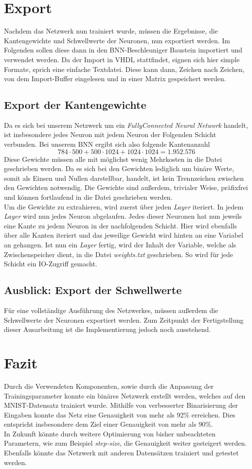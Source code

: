 \chapter{Export}
Nachdem das Netzwerk nun trainiert wurde, müssen die Ergebnisse, die Kantengewichte und Schwellwerte der Neuronen, nun exportiert werden. Im Folgenden sollen diese dann in den BNN-Beschleuniger Baustein importiert und verwendet werden. Da der Import in VHDL stattfindet, eignen sich hier simple Formate, sprich eine einfache Textdatei. Diese kann dann, Zeichen nach Zeichen, von dem Import-Buffer eingelesen und in einer Matrix gespeichert werden.
\section{Export der Kantengewichte}\label{exportKanten}
Da es sich bei unserem Netzwerk um ein \textit{FullyConnected Neural Network} handelt, ist insbesondere jedes Neuron mit jedem Neuron der Folgenden Schicht verbunden. Bei unserem BNN ergibt sich also folgende Kantenanzahl
\[784 \cdot 500 + 500 \cdot 1024 + 1024 \cdot 1024 = 1.952.576 \]
Diese Gewichte müssen alle mit möglichst wenig Mehrkosten in die Datei geschrieben werden. Da es sich bei den Gewichten lediglich um binäre Werte, somit als Einsen und Nullen darstellbar, handelt, ist kein Trennzeichen zwischen den Gewichten notwendig. Die Gewichte sind außerdem, trivialer Weise, präfixfrei und können fortlaufend in die Datei geschrieben werden.\\
Um die Gewichte zu extrahieren, wird zuerst über jeden \textit{Layer} iteriert. In jedem \textit{Layer} wird nun jedes Neuron abgelaufen. Jedes dieser Neuronen hat nun jeweils eine Kante zu jedem Neuron in der nachfolgenden Schicht. Hier wird ebenfalls über alle Kanten iteriert und das jeweilige Gewicht wird hinten an eine Variabel an gehangen. Ist nun ein \textit{Layer} fertig, wird der Inhalt der Variable, welche als Zwischenspeicher dient, in die Datei \textit{weights.txt} geschrieben. So wird für jede Schicht ein IO-Zugriff gemacht.
\section{Ausblick: Export der Schwellwerte}
Für eine vollständige Ausführung des Netzwerkes, müssen außerdem die Schwellwerte der Neuronen exportiert werden. Zum Zeitpunkt der Fertigstellung dieser Ausarbeitung ist die Implementierung jedoch noch ausstehend.
\chapter{Fazit}
Durch die Verwendeten Komponenten, sowie durch die Anpassung der Trainingsparameter konnte ein binäres Netzwerk erstellt werden, welches auf den MNIST-Datensatz trainiert wurde. Mithilfe von verbesserter Binarisierung der Eingaben konnte das Netz eine Genauigkeit von mehr als 92\% erreichen. Dies entspricht insbesondere dem Ziel einer Genauigkeit von mehr als 90\%.\\
In Zukunft könnte durch weitere Optimierung von bisher unbeachteten Parametern, wie zum Beispiel \textit{step-size}, die Genauigkeit weiter gesteigert werden. Ebenfalls könnte das Netzwerk mit anderen Datensätzen trainiert und getestet werden.